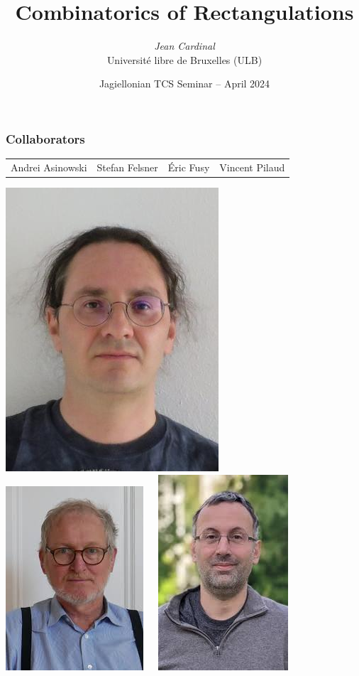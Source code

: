 \documentclass[11pt]{beamer}%
\title{Combinatorics of Rectangulations}
\author{{\em  Jean Cardinal}\\
    Universit\'e libre de Bruxelles (ULB)}
\date{Jagiellonian TCS Seminar -- April 2024}
\begin{document}
{
\frame{\titlepage}
}


\begin{frame}
  \frametitle{Collaborators}
  \begin{tabular}{cccc}
    Andrei Asinowski & Stefan Felsner & \'Eric Fusy &  Vincent Pilaud \\
    \end{tabular}
  \begin{center}
  \includegraphics[height=.3\textheight]{asinowski.jpg}\ \ \ 
  \includegraphics[height=.3\textheight]{felsner.jpg}\ \ \ 
  \includegraphics[height=.3\textheight]{fusy.jpeg}\ \ \ 

\end{center}
\end{frame}
\end{document}
